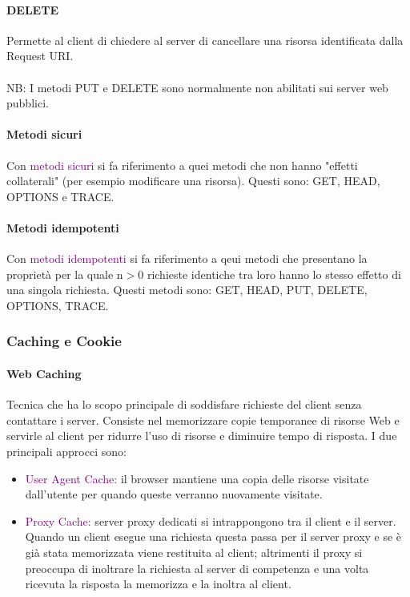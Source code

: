 \paragraph{DELETE} Permette al client di chiedere al server di cancellare una risorsa identificata dalla Request URI.
\\ \\ NB: I metodi PUT e DELETE sono normalmente non abilitati sui server web pubblici.

\newpage
\paragraph{Metodi sicuri} Con \textcolor{purple}{metodi sicuri} si fa riferimento a quei metodi che non hanno "effetti collaterali" (per esempio modificare una risorsa). Questi sono: GET, HEAD, OPTIONS e TRACE.

\paragraph{Metodi idempotenti} Con \textcolor{purple}{metodi idempotenti} si fa riferimento a qeui metodi che presentano la proprietà per la quale n$>$0 richieste identiche tra loro hanno lo stesso effetto di una singola richiesta. Questi metodi sono: GET, HEAD, PUT, DELETE, OPTIONS, TRACE.

\subsubsection{Caching e Cookie}
\paragraph{Web Caching} Tecnica che ha lo scopo principale di soddisfare richieste del client senza contattare i server. Consiste nel memorizzare copie temporanee di risorse Web e servirle al client per ridurre l’uso di risorse e diminuire tempo di risposta. I due principali approcci sono:
\begin{itemize}
    \item \textcolor{purple}{User Agent Cache:} il browser mantiene una copia delle risorse visitate dall'utente per quando queste verranno nuovamente visitate.
    \item \textcolor{purple}{Proxy Cache:} server proxy dedicati si intrappongono tra il client e il server. Quando un client esegue una richiesta questa passa per il server proxy e se è già stata memorizzata viene restituita al client; altrimenti il proxy si preoccupa di inoltrare la richiesta al server di competenza e una volta ricevuta la risposta la memorizza e la inoltra al client.
\end{itemize}

